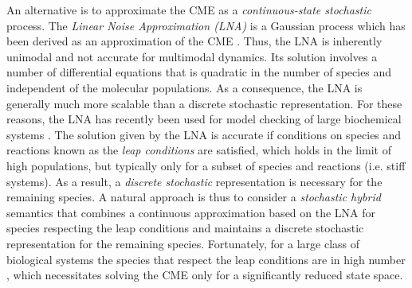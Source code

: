 \documentclass{llncs}
\begin{document}
An alternative is to approximate the CME as a \emph{continuous-state stochastic} process.
The \emph{Linear Noise Approximation (LNA)}  is a Gaussian process which has been derived as an approximation of the CME \cite{Kampen1992b}. Thus, the LNA is inherently unimodal and not accurate for multimodal dynamics. Its solution involves a number of differential equations that is quadratic in the number of species and independent of the molecular populations. As a consequence, the LNA is generally much more scalable than a discrete stochastic representation. For these reasons, the LNA has recently been  used for model checking of large biochemical systems \cite{cardelli2015stochastic,bortolussi2013model}. The solution given by the LNA is accurate if conditions on species and reactions known as the \emph{leap conditions} are satisfied,
which holds %
in the limit of high populations, but %
typically only for a subset of species and reactions (i.e. stiff systems).
As a result, a \emph{discrete stochastic} representation is necessary for the remaining species. A natural approach is thus to consider a \emph{stochastic hybrid} semantics that combines a continuous approximation based on the LNA for species respecting the leap conditions and maintains a discrete stochastic representation for the remaining species. Fortunately, for a large class of biological systems the species that respect the leap conditions are in high number \cite{Wallace2012}, which necessitates solving the CME only for a significantly reduced state space. 

\end{document}
